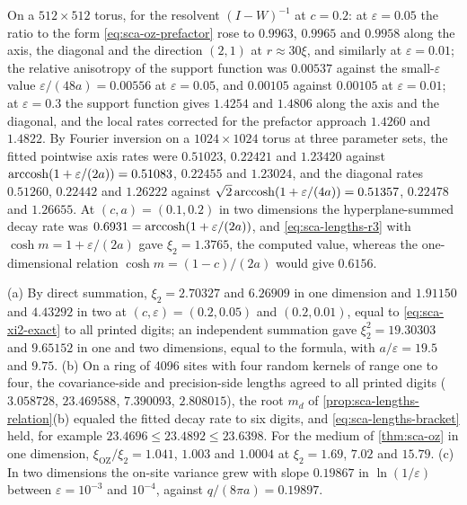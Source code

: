 \begin{numcheck}\label{chk:sca-oz-lattice}
On a $512\times512$ torus, for the resolvent $(I-W)^{-1}$ at $c=0.2$: at $\varepsilon=0.05$ the ratio to the form \eqref{eq:sca-oz-prefactor} rose to $0.9963$, $0.9965$ and $0.9958$ along the axis, the diagonal and the direction $(2,1)$ at $r\approx30\xi$, and similarly at $\varepsilon=0.01$; the relative anisotropy of the support function was $0.00537$ against the small-$\varepsilon$ value $\varepsilon/(48a)=0.00556$ at $\varepsilon=0.05$, and $0.00105$ against $0.00105$ at $\varepsilon=0.01$; at $\varepsilon=0.3$ the support function gives $1.4254$ and $1.4806$ along the axis and the diagonal, and the local rates corrected for the prefactor approach $1.4260$ and $1.4822$. By Fourier inversion on a $1024\times1024$ torus at three parameter sets, the fitted pointwise axis rates were $0.51023$, $0.22421$ and $1.23420$ against $\operatorname{arccosh}(1+\varepsilon/(2a))=0.51083$, $0.22455$ and $1.23024$, and the diagonal rates $0.51260$, $0.22442$ and $1.26222$ against $\sqrt2\operatorname{arccosh}(1+\varepsilon/(4a))=0.51357$, $0.22478$ and $1.26655$. At $(c,a)=(0.1,0.2)$ in two dimensions the hyperplane-summed decay rate was $0.6931=\operatorname{arccosh}(1+\varepsilon/(2a))$, and \eqref{eq:sca-lengths-r3} with $\cosh m=1+\varepsilon/(2a)$ gave $\xi_2=1.3765$, the computed value, whereas the one-dimensional relation $\cosh m=(1-c)/(2a)$ would give $0.6156$.
\end{numcheck}

\begin{numcheck}\label{chk:sca-lengths}
(a) By direct summation, $\xi_2=2.70327$ and $6.26909$ in one dimension and $1.91150$ and $4.43292$ in two at $(c,\varepsilon)=(0.2,0.05)$ and $(0.2,0.01)$, equal to \eqref{eq:sca-xi2-exact} to all printed digits; an independent summation gave $\xi_2^2=19.30303$ and $9.65152$ in one and two dimensions, equal to the formula, with $a/\varepsilon=19.5$ and $9.75$. (b) On a ring of 4096 sites with four random kernels of range one to four, the covariance-side and precision-side lengths agreed to all printed digits ($3.058728$, $23.469588$, $7.390093$, $2.808015$), the root $m_d$ of \cref{prop:sca-lengths-relation}(b) equaled the fitted decay rate to six digits, and \eqref{eq:sca-lengths-bracket} held, for example $23.4696\le23.4892\le23.6398$. For the medium of \cref{thm:sca-oz} in one dimension, $\xi_{\mathrm{OZ}}/\xi_2=1.041$, $1.003$ and $1.0004$ at $\xi_2=1.69$, $7.02$ and $15.79$. (c) In two dimensions the on-site variance grew with slope $0.19867$ in $\ln(1/\varepsilon)$ between $\varepsilon=10^{-3}$ and $10^{-4}$, against $q/(8\pi a)=0.19897$.
\end{numcheck}

